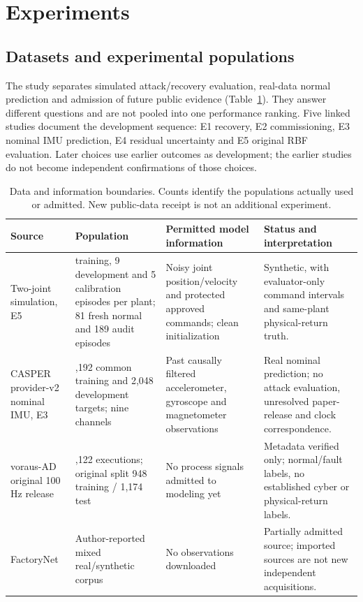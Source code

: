 \section{Experiments}\label{sec:experiments}
\subsection{Datasets and experimental populations}
The study separates simulated attack/recovery evaluation, real-data normal prediction and admission of future public evidence (Table~\ref{tab:data}). They answer different questions and are not pooled into one performance ranking. Five linked studies document the development sequence: E1 recovery, E2 commissioning, E3 nominal IMU prediction, E4 residual uncertainty and E5 original RBF evaluation. Later choices use earlier outcomes as development; the earlier studies do not become independent confirmations of those choices.

\begin{table}[t]\centering
\caption{Data and information boundaries. Counts identify the populations actually used or admitted. New public-data receipt is not an additional experiment.}\label{tab:data}
\begin{tabular}{>{\raggedright\arraybackslash}p{}>{\raggedright\arraybackslash}p{}>{\raggedright\arraybackslash}p{}>{\raggedright\arraybackslash}p{}}\toprule
Source & Population & Permitted model information & Status and interpretation\\\midrule
Two-joint simulation, E5 & 3 training, 9 development and 5 calibration episodes per plant; 81 fresh normal and 189 audit episodes & Noisy joint position/velocity and protected approved commands; clean initialization & Synthetic, with evaluator-only command intervals and same-plant physical-return truth.\\
CASPER provider-v2 nominal IMU, E3 & 8,192 common training and 2,048 development targets; nine channels & Past causally filtered accelerometer, gyroscope and magnetometer observations & Real nominal prediction; no attack evaluation, unresolved paper-release and clock correspondence.\\
voraus-AD original 100 Hz release & 2,122 executions; original split 948 training / 1,174 test & No process signals admitted to modeling yet & Metadata verified only; normal/fault labels, no established cyber or physical-return labels.\\
FactoryNet & Author-reported mixed real/synthetic corpus & No observations downloaded & Partially admitted source; imported sources are not new independent acquisitions.\\\bottomrule
\end{tabular}
\end{table}

